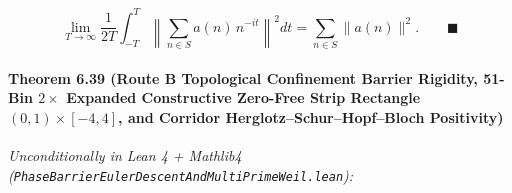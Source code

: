 \documentclass[
  11pt,
]{article}
\begin{document}
\begin{enumerate}
  \[\lim_{T \to \infty} \frac{1}{2T}\int_{-T}^{T} \left\|\sum_{n \in S} a(n)\,n^{-it}\right\|^2 dt = \sum_{n \in S} \|a(n)\|^2. \qquad \blacksquare\]
\end{enumerate}

\paragraph{\texorpdfstring{Theorem 6.39 (Route B Topological Confinement
Barrier Rigidity, 51-Bin \(2\times\) Expanded Constructive Zero-Free
Strip Rectangle \((0, 1) \times [-4, 4]\), and Corridor
Herglotz--Schur--Hopf--Bloch
Positivity)}{Theorem 6.39 (Route B Topological Confinement Barrier Rigidity, 51-Bin 2\textbackslash times Expanded Constructive Zero-Free Strip Rectangle (0, 1) \textbackslash times {[}-4, 4{]}, and Corridor Herglotz--Schur--Hopf--Bloch Positivity)}}\label{theorem-6.39-route-b-topological-confinement-barrier-rigidity-51-bin-2times-expanded-constructive-zero-free-strip-rectangle-0-1-times--4-4-and-corridor-herglotzschurhopfbloch-positivity}

\emph{Unconditionally in Lean 4 + Mathlib4
(\texttt{PhaseBarrierEulerDescentAndMultiPrimeWeil.lean}):}
\end{document}
